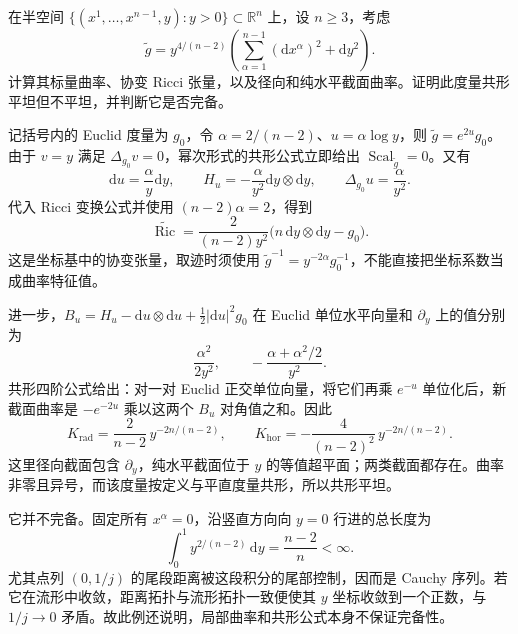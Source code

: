 \begin{exercise}\label{g3:ex:conformal-halfspace-scalar-flat}
	在半空间 \(\{(x^1,\ldots,x^{n-1},y):y>0\}\subset\mathbb R^n\) 上，设 \(n\ge3\)，考虑
	\[
		\widetilde g=y^{4/(n-2)}\left(\sum_{\alpha=1}^{n-1}(\mathrm dx^\alpha)^2+\mathrm dy^2\right).
	\]
	计算其标量曲率、协变 Ricci 张量，以及径向和纯水平截面曲率。证明此度量共形平坦但不平坦，并判断它是否完备。
\end{exercise}
\begin{solution}
	记括号内的 Euclid 度量为 \(g_0\)，令 \(\alpha=2/(n-2)\)、\(u=\alpha\log y\)，则 \(\widetilde g=e^{2u}g_0\)。由于 \(v=y\) 满足 \(\Delta_{g_0}v=0\)，幂次形式的共形公式立即给出 \(\operatorname{Scal}_{\widetilde g}=0\)。又有
	\[
		\mathrm du=\frac\alpha y\mathrm dy,\qquad
		H_u=-\frac\alpha{y^2}\mathrm dy\otimes\mathrm dy,\qquad
		\Delta_{g_0}u=\frac\alpha{y^2}.
	\]
	代入 Ricci 变换公式并使用 \((n-2)\alpha=2\)，得到
	\[
		\widetilde{\operatorname{Ric}}
		=\frac{2}{(n-2)y^2}
		\bigl(n\,\mathrm dy\otimes\mathrm dy-g_0\bigr).
	\]
	这是坐标基中的协变张量，取迹时须使用 \(\widetilde g^{-1}=y^{-2\alpha}g_0^{-1}\)，不能直接把坐标系数当成曲率特征值。

	进一步，\(B_u=H_u-\mathrm du\otimes\mathrm du+\tfrac12|\mathrm du|^2g_0\) 在 Euclid 单位水平向量和 \(\partial_y\) 上的值分别为
	\[
		\frac{\alpha^2}{2y^2},\qquad
		-\frac{\alpha+\alpha^2/2}{y^2}.
	\]
	共形四阶公式给出：对一对 Euclid 正交单位向量，将它们再乘 \(e^{-u}\) 单位化后，新截面曲率是 \(-e^{-2u}\) 乘以这两个 \(B_u\) 对角值之和。因此
	\[
		K_{\mathrm{rad}}=\frac{2}{n-2}\,y^{-2n/(n-2)},\qquad
		K_{\mathrm{hor}}=-\frac{4}{(n-2)^2}\,y^{-2n/(n-2)}.
	\]
	这里径向截面包含 \(\partial_y\)，纯水平截面位于 \(y\) 的等值超平面；两类截面都存在。曲率非零且异号，而该度量按定义与平直度量共形，所以共形平坦。

	它并不完备。固定所有 \(x^\alpha=0\)，沿竖直方向向 \(y=0\) 行进的总长度为
	\[
		\int_0^1 y^{2/(n-2)}\,\mathrm dy=\frac{n-2}{n}<\infty.
	\]
	尤其点列 \((0,1/j)\) 的尾段距离被这段积分的尾部控制，因而是 Cauchy 序列。若它在流形中收敛，距离拓扑与流形拓扑一致便使其 \(y\) 坐标收敛到一个正数，与 \(1/j\to0\) 矛盾。故此例还说明，局部曲率和共形公式本身不保证完备性。
\end{solution}

